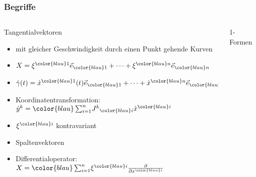 %
%
%
\bgroup
{}
\begin{frame}[t]
\setlength{\abovedisplayskip}{5pt}
\setlength{\belowdisplayskip}{5pt}
\frametitle{Begriffe}
\vspace{-20pt}
\begin{columns}[t,onlytextwidth]
\begin{column}{0.48\textwidth}
\begin{block}{Tangentialvektoren\strut
{}}
\begin{itemize}
\item<1-> mit gleicher Geschwindigkeit durch einen Punkt gehende Kurven
\item<2->
\(
X = \xi^{\color{blau}1}\vec{e}_{\color{blau}1} + \dots +
\xi^{\color{blau}n} \vec{e}_{\color{blau}n}
\)
\item<3->
\(
\dot{\gamma}(t)
=
\dot{x}^{\color{blau}1}(t) \vec{e}_{\color{blau}1} + \dots
+ \dot{x}^{\color{blau}n}\vec{e}_{\color{blau}n}
\)
\item<4-> Koordinatentransformation:
\(
\dot{y}^k
=
{\color{blau}\sum_{i=1}^n}J^k\mathstrut_{\color{blau}i}\dot{x}^{\color{blau}i}
\)
\item<5-> $\xi^{\color{blau}i}$ {\color{blau}kontravariant}
\item<6-> {\color{blau}Spalten}vektoren
\item<7-> Differentialoperator:
\(
X
=
{\color{blau}\sum_{i=1}^n}
\xi^{\color{blau}i} \frac{\partial}{\partial x^{\color{blau}i}}
\)
\end{itemize}
\end{block}
\end{column}
\begin{column}{0.48\textwidth}
\begin{block}{1-Formen\strut
{}}
\end{block}
\end{column}
\end{columns}
\end{frame}
